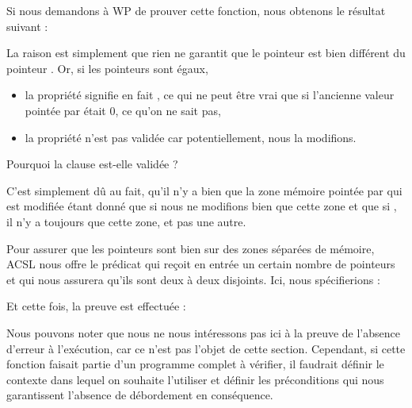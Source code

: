 


Si nous demandons à WP de prouver cette fonction, nous obtenons le
résultat suivant :





La raison est simplement que rien ne garantit que le pointeur  est bien
différent du pointeur . Or, si les pointeurs sont égaux,



\begin{itemize}
\item la propriété  signifie en fait
, ce qui ne peut être vrai que si l'ancienne valeur
pointée par  était 0, ce qu'on ne sait pas,
\item la propriété  n'est pas validée car potentiellement,
nous la modifions.
\end{itemize}


\begin{Question}
Pourquoi la clause  est-elle validée ?

C'est simplement dû au fait, qu'il n'y a bien que la zone mémoire pointée par
 qui est modifiée étant donné que si  nous ne modifions bien
que cette zone et que si , il n'y a toujours que cette zone, et
pas une autre.
\end{Question}


Pour assurer que les pointeurs sont bien sur des zones séparées de mémoire,
ACSL nous offre le prédicat  qui reçoit en entrée
un certain nombre de pointeurs et qui nous assurera qu'ils sont deux à deux
disjoints. Ici, nous spécifierions :






Et cette fois, la preuve est effectuée :





Nous pouvons noter que nous ne nous intéressons pas ici à la preuve de
l'absence d'erreur à l'exécution, car ce n'est pas l'objet de cette section.
Cependant, si cette fonction faisait partie d'un programme complet à vérifier,
il faudrait définir le contexte dans lequel on souhaite l'utiliser et définir
les préconditions qui nous garantissent l'absence de débordement en conséquence.


